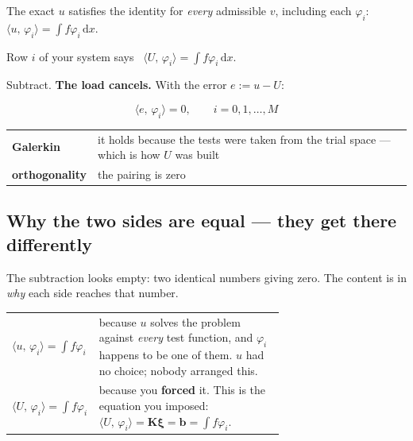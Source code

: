 \documentclass[11pt]{article}
\newcommand{\dx}{\,\mathrm{d}x}
\newcommand{\ip}[2]{\bigl\langle #1,\,#2\bigr\rangle}
\newcommand{\Kmat}{\bm{K}}
\begin{document}
\begin{pts}
\item The exact $u$ satisfies the identity for \emph{every} admissible $v$,
      including each $\varphi_i$: \ $\ip{u}{\varphi_i}=\int f\varphi_i\dx$.
\item Row $i$ of your system says \ $\ip{U}{\varphi_i}=\int f\varphi_i\dx$.
\item Subtract. \textbf{The load cancels.} With the error $e:=u-U$:
\end{pts}
\[
  \boxed{\;\ip{e}{\varphi_i}=0,\qquad i=0,1,\dots,M\;}
\]

\begin{center}\small
\renewcommand{\arraystretch}{1.3}
\begin{tabular}{@{}ll@{}}
\toprule
\textbf{Galerkin} & it holds because the tests were taken from the trial
                    space --- which is how $U$ was built\\
\textbf{orthogonality} & the pairing is zero\\
\bottomrule
\end{tabular}
\end{center}

\subsection*{Why the two sides are equal --- they get there differently}

The subtraction looks empty: two identical numbers giving zero. The content is
in \emph{why} each side reaches that number.

\begin{center}\small
\renewcommand{\arraystretch}{1.4}
\begin{tabular}{@{}l>{\raggedright\arraybackslash}p{0.68\linewidth}@{}}
\toprule
$\ip{u}{\varphi_i}=\int f\varphi_i$
  & because $u$ solves the problem against \emph{every} test function, and
    $\varphi_i$ happens to be one of them. $u$ had no choice; nobody arranged
    this.\\
$\ip{U}{\varphi_i}=\int f\varphi_i$
  & because you \textbf{forced} it. This is the equation you imposed:
    $\ip{U}{\varphi_i}=\Kmat\bm{\xi}=\bm{b}=\int f\varphi_i$.\\
\bottomrule
\end{tabular}
\end{center}
\end{document}
